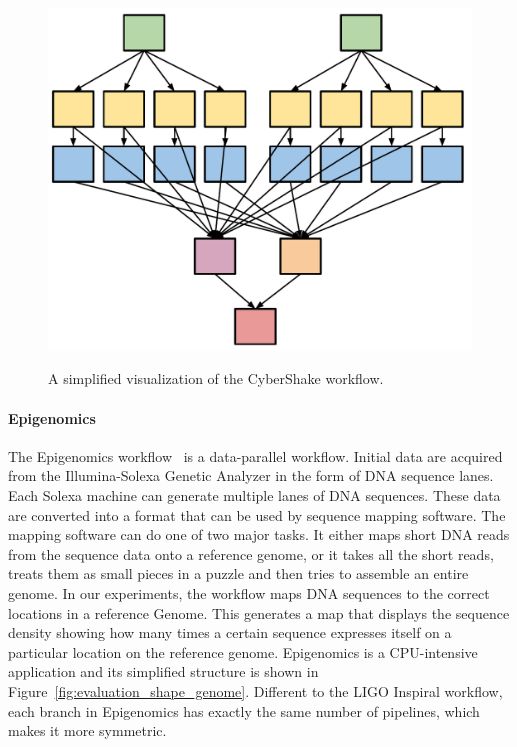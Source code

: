 \begin{figure}[htb]
	\centering
	\includegraphics[width=0.7\linewidth]{figures/balance/figure16.pdf} \\
	\caption{A simplified visualization of the CyberShake workflow.}
	\label{fig:evaluation_shape_cybershake}
\end{figure}

\paragraph{\textbf{Epigenomics}}
The Epigenomics workflow~\cite{Epigenome} is a data-parallel workflow. Initial data are acquired from the Illumina-Solexa Genetic Analyzer in the form of DNA sequence lanes. Each Solexa machine can generate multiple lanes of DNA sequences. These data are converted into a format that can be used by sequence mapping software. The mapping software can do one of two major tasks. It either maps short DNA reads from the sequence data onto a reference genome, or it takes all the short reads, treats them as small pieces in a puzzle and then tries to assemble an entire genome. In our experiments, the workflow maps DNA sequences to the correct locations in a reference Genome. This generates a map that displays the sequence density showing how many times a certain sequence expresses itself on a particular location on the reference genome. Epigenomics is a CPU-intensive application and its simplified structure is shown in Figure~\ref{fig:evaluation_shape_genome}. Different to the LIGO Inspiral workflow, each branch in Epigenomics has exactly the same number of pipelines, which makes it more symmetric. 

